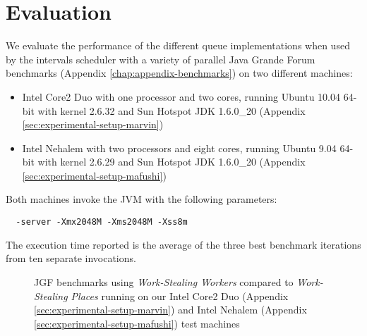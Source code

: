 
\chapter{Evaluation}
\label{chap:locality-evaluation}

We evaluate the performance of the different queue implementations
when used by the intervals scheduler with a variety of parallel Java
Grande Forum benchmarks (Appendix \ref{chap:appendix-benchmarks}) on
two different machines:

\begin{itemize}
\item Intel Core2 Duo with one processor and two cores, running Ubuntu
  10.04 64-bit with kernel 2.6.32 and Sun Hotspot JDK 1.6.0\_20
  (Appendix \ref{sec:experimental-setup-marvin})
\item Intel Nehalem with two processors and eight cores, running
  Ubuntu 9.04 64-bit with kernel 2.6.29 and Sun Hotspot JDK 1.6.0\_20
  (Appendix \ref{sec:experimental-setup-mafushi})
\end{itemize}

Both machines invoke the JVM with the following parameters:

\begin{lstlisting}
  -server -Xmx2048M -Xms2048M -Xss8m
\end{lstlisting}

The execution time reported is the average of the three best benchmark
iterations from ten separate invocations.

\begin{figure}[!ht]
  \centering
  \caption[Work-Stealing Workers compared to Work-Stealing Places]{JGF
    benchmarks using \emph{Work-Stealing Workers} compared to
    \emph{Work-Stealing Places} running on our Intel Core2 Duo
    (Appendix \ref{sec:experimental-setup-marvin}) and Intel Nehalem
    (Appendix \ref{sec:experimental-setup-mafushi}) test machines}
  \label{fig:locality-evaluation-jgf}
\end{figure}

